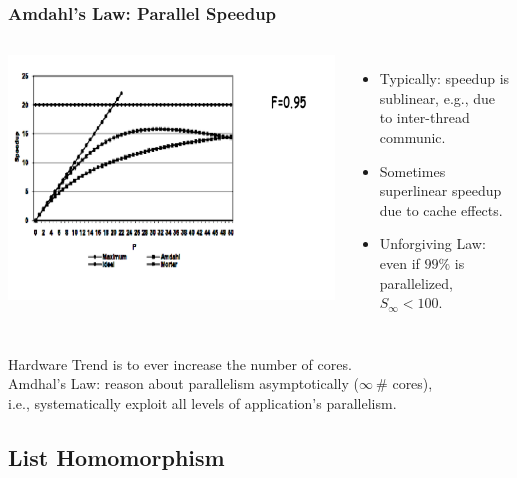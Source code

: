 \documentclass{beamer}
\begin{document}
\begin{frame}[fragile,t]
\frametitle{Amdahl's Law: Parallel Speedup}

\medskip

\begin{columns}
\includegraphics[width=44ex]{Figures/L1/ParSpeedup}
\vspace{-5ex}
\begin{itemize}
    \item Typically: speedup is sublinear, e.g., due to inter-thread communic. 
    \item Sometimes superlinear speedup due to cache effects.
    \item Unforgiving Law: even if $99\%$ is parallelized, $S_{\infty} < 100$.
\end{itemize}
\end{columns}

\pause
\vspace{-3ex}

Hardware Trend is to ever increase the number of cores.\\
\alert{Amdhal's Law: reason about parallelism asymptotically ($\infty \ \#$ cores),\\
i.e., systematically exploit all levels of application's parallelism.}

\end{frame}




\subsection{List Homomorphism}
\end{document}
